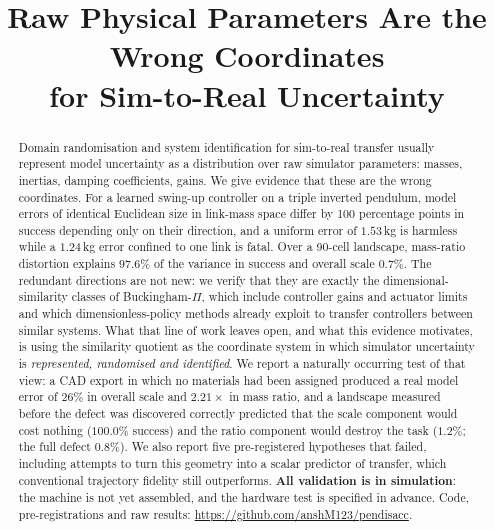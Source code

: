 \documentclass[conference]{IEEEtran}
\newcommand{\repo}{\url{https://github.com/anshM123/pendisacc}}
\begin{document}
\title{Raw Physical Parameters Are the Wrong Coordinates\\
for Sim-to-Real Uncertainty}

\author{
}

\maketitle

\begin{abstract}
Domain randomisation and system identification for sim-to-real transfer
usually represent model uncertainty as a distribution over raw simulator
parameters: masses, inertias, damping coefficients, gains. We give evidence
that these are the wrong coordinates. For a learned swing-up controller on a
triple inverted pendulum, model errors of identical Euclidean size in link-mass
space differ by 100 percentage points in success depending only on their
direction, and a uniform error of $1.53$\,kg is harmless while a $1.24$\,kg
error confined to one link is fatal. Over a 90-cell landscape, mass-ratio
distortion explains $97.6\%$ of the variance in success and overall scale
$0.7\%$. The redundant directions are not new: we verify that they are exactly
the dimensional-similarity classes of Buckingham-$\Pi$, which include
controller gains and actuator limits and which dimensionless-policy methods
already exploit to transfer controllers between similar systems. What that line
of work leaves open, and what this evidence motivates, is using the similarity
quotient as the coordinate system in which simulator uncertainty is
\emph{represented, randomised and identified}. We report a naturally occurring
test of that view: a CAD export in which no materials had been assigned
produced a real model error of $26\%$ in overall scale and $2.21\times$ in mass
ratio, and a landscape measured before the defect was discovered correctly
predicted that the scale component would cost nothing ($100.0\%$ success) and
the ratio component would destroy the task ($1.2\%$; the full defect
$0.8\%$). We also report five pre-registered hypotheses that failed, including
attempts to turn this geometry into a scalar predictor of transfer, which
conventional trajectory fidelity still outperforms. \textbf{All validation is
in simulation}: the machine is not yet assembled, and the hardware test is
specified in advance. Code, pre-registrations and raw results: \repo.
\end{abstract}
\end{document}
